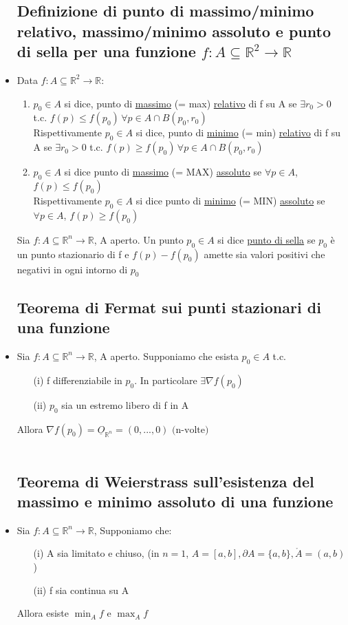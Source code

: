 \documentclass{report}
\newcommand{\ace}{\`e }
\newcommand{\Ins}[1]{\mathbb{#1}}
\newcommand{\R}{\Ins{R}}
\newcommand{\f}{f: A \subseteq \R^2 \to \R}
\newcommand{\fn}{f: A \subseteq \R^n \to \R}
\newcommand{\p}{\partial}
\newcommand{\overcirc}[1]{\mathring{#1}}
\begin{document}
\begin{itemize}
  \subsection{Definizione di punto di massimo/minimo relativo, massimo/minimo assoluto e punto di sella per una funzione $\f$}
  \item Data $\f$: 
        \begin{enumerate}
          \item $p_0 \in A$ si dice, punto di \underline{massimo} (= max) \underline{relativo} di f su A se 
                $\exists r_0 > 0$ t.c. $f(p) \leq f(p_0) \, \forall p \in A \cap B(p_0,r_0)$ \\
                Rispettivamente $p_0 \in A$ si dice, punto di \underline{minimo} (= min) \underline{relativo} di f su A se 
                $\exists r_0 > 0$ t.c. $f(p) \geq f(p_0) \, \forall p \in A \cap B(p_0,r_0)$
          \item $p_0 \in A$ si dice punto di \underline{massimo} (= MAX) \underline{assoluto} se 
                $\forall p \in A$, $f(p) \leq f(p_0)$ \\
                Rispettivamente $p_0 \in A$ si dice punto di \underline{minimo} (= MIN) \underline{assoluto} se 
                $\forall p \in A$, $f(p) \geq f(p_0)$ 
        \end{enumerate}
        Sia $\fn$, A aperto. Un punto $p_0 \in A$ si dice \underline{punto di sella} se $p_0$ \ace un punto 
        stazionario di f e $f(p)-f(p_0)$ amette sia valori positivi che negativi in ogni intorno di $p_0$

  \subsection{Teorema di Fermat sui punti stazionari di una funzione}
  \item Sia $\fn$, A aperto. Supponiamo che esista $p_0 \in A$ t.c. 
          \begin{enumerate}
            \item[(i)] f differenziabile in $p_0$. In particolare $\exists \nabla f(p_0)$
            \item[(ii)] $p_0$ sia un estremo libero di f in A
          \end{enumerate}
          Allora $\nabla f(p_0) = \underline{O}_{\R^n} = (0,...,0) \text{ (n-volte)}$ \\\\       

  \subsection{Teorema di Weierstrass sull’esistenza del massimo e minimo assoluto di una funzione}
  \item Sia $\fn$, Supponiamo che:
        \begin{itemize}
          \item[(i)] A sia limitato e chiuso, (in $n=1$, $A = [a,b], \p A = \{a,b\}, \overcirc{A} = (a,b)$)
          \item[(ii)] f sia continua su A 
        \end{itemize}
        Allora esiste $\min_{A}f$ e $\max_{A}f$


\end{itemize}
\end{document}
